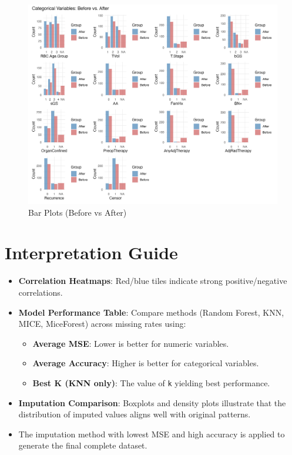\documentclass[
]{article}
\providecommand{\tightlist}{%
  \setlength{\itemsep}{0pt}\setlength{\parskip}{0pt}}
\begin{document}
\begin{figure}[H]

{\centering \includegraphics[width=0.9\linewidth]{../example/barplots_cat_before_after} 

}

\caption{Bar Plots (Before vs After)}\label{fig:show-barplot}
\end{figure}

\section{Interpretation Guide}\label{interpretation-guide}

\begin{itemize}
\tightlist
\item
  \textbf{Correlation Heatmaps}: Red/blue tiles indicate strong
  positive/negative correlations.
\item
  \textbf{Model Performance Table}: Compare methods (Random Forest, KNN,
  MICE, MiceForest) across missing rates using:

  \begin{itemize}
  \tightlist
  \item
    \textbf{Average MSE}: Lower is better for numeric variables.
  \item
    \textbf{Average Accuracy}: Higher is better for categorical
    variables.
  \item
    \textbf{Best K (KNN only)}: The value of \texttt{k} yielding best
    performance.
  \end{itemize}
\item
  \textbf{Imputation Comparison}: Boxplots and density plots illustrate
  that the distribution of imputed values aligns well with original
  patterns.
\item
  The imputation method with lowest MSE and high accuracy is applied to
  generate the final complete dataset.
\end{itemize}
\end{document}
